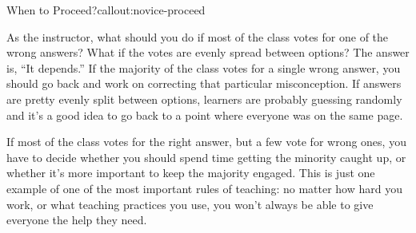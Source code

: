 \begin{callout}{When to Proceed?}{callout:novice-proceed}

As the instructor, what should you do if most of the class votes for
one of the wrong answers? What if the votes are evenly spread between
options?  The answer is, ``It depends.''  If the majority of the class
votes for a single wrong answer, you should go back and work on
correcting that particular misconception. If answers are pretty evenly
split between options, learners are probably guessing randomly and
it's a good idea to go back to a point where everyone was on the same
page.

If most of the class votes for the right answer, but a few vote for
wrong ones, you have to decide whether you should spend time getting
the minority caught up, or whether it's more important to keep the
majority engaged.  This is just one example of one of the most
important rules of teaching: no matter how hard you work, or what
teaching practices you use, you won't always be able to give everyone
the help they need.

\end{callout}

